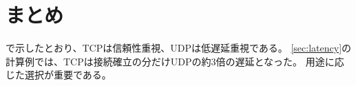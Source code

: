 
\section{まとめ}
\label{sec:conclusion}

で示したとおり、TCPは信頼性重視、UDPは低遅延重視である。
\cref{sec:latency}の計算例では、TCPは接続確立の分だけUDPの約3倍の遅延となった。
用途に応じた選択が重要である。
